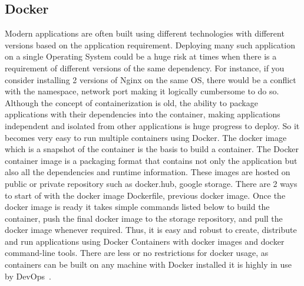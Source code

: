 \subsection{Docker}
Modern applications are often built using different technologies with
different versions based on the application requirement. Deploying
many such application on a single Operating System could be a huge
risk at times when there is a requirement of different versions of the
same dependency. For instance, if you consider installing 2 versions
of Nginx on the same OS, there would be a conflict with the namespace,
network port making it logically cumbersome to do so. Although the
concept of containerization is old, the ability to package
applications with their dependencies into the container, making
applications independent and isolated from other applications is huge
progress to deploy. So it becomes very easy to run multiple containers
using Docker. The docker image which is a snapshot of the container is
the basis to build a container. The Docker container image is a
packaging format that contains not only the application but also all
the dependencies and runtime information. These images are hosted on
public or private repository such as docker.hub, google storage.
There are 2 ways to start of with the docker image Dockerfile,
previous docker image. Once the docker image is ready it takes simple
commands listed below to build the container, push the final docker
image to the storage repository, and pull the docker image whenever
required. Thus, it is easy and robust to create, distribute and run
applications using Docker Containers with docker images and docker
command-line tools. There are less or no restrictions for docker
usage, as containers can be built on any machine with Docker installed
it is highly in use by DevOps~\cite{hid-sp18-602-docker}.

